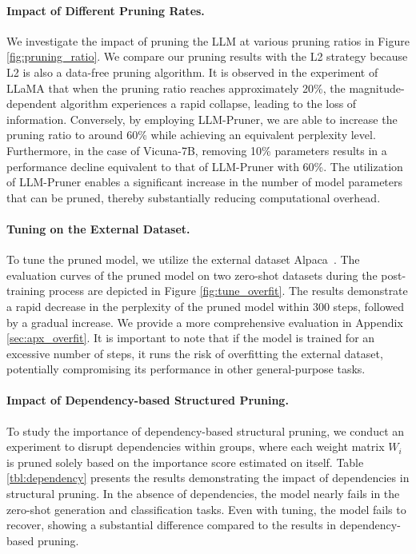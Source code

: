 \paragraph{Impact of Different Pruning Rates.} We investigate the impact of pruning the LLM at various pruning ratios in Figure \ref{fig:pruning_ratio}. We compare our pruning results with the L2 strategy because L2 is also a data-free pruning algorithm. It is observed in the experiment of LLaMA that when the pruning ratio reaches approximately 20\%, the magnitude-dependent algorithm experiences a rapid collapse, leading to the loss of information. Conversely, by employing LLM-Pruner, we are able to increase the pruning ratio to around 60\% while achieving an equivalent perplexity level. Furthermore, in the case of Vicuna-7B, removing 10\% parameters results in a performance decline equivalent to that of LLM-Pruner with 60\%. The utilization of LLM-Pruner enables a significant increase in the number of model parameters that can be pruned, thereby substantially reducing computational overhead.

\paragraph{Tuning on the External Dataset.} To tune the pruned model, we utilize the external dataset Alpaca~\cite{alpaca}. The evaluation curves of the pruned model on two zero-shot datasets during the post-training process are depicted in Figure \ref{fig:tune_overfit}. The results demonstrate a rapid decrease in the perplexity of the pruned model within 300 steps, followed by a gradual increase. We provide a more comprehensive evaluation in Appendix \ref{sec:apx_overfit}. It is important to note that if the model is trained for an excessive number of steps, it runs the risk of overfitting the external dataset, potentially compromising its performance in other general-purpose tasks.

\paragraph{Impact of Dependency-based Structured Pruning.} \label{exp:dependency}
To study the importance of dependency-based structural pruning, we conduct an experiment to disrupt dependencies within groups, where each weight matrix $W_i$ is pruned solely based on the importance score estimated on itself. Table \ref{tbl:dependency} presents the results demonstrating the impact of dependencies in structural pruning. In the absence of dependencies, the model nearly fails in the zero-shot generation and classification tasks. Even with tuning, the model fails to recover, showing a substantial difference compared to the results in dependency-based pruning.

